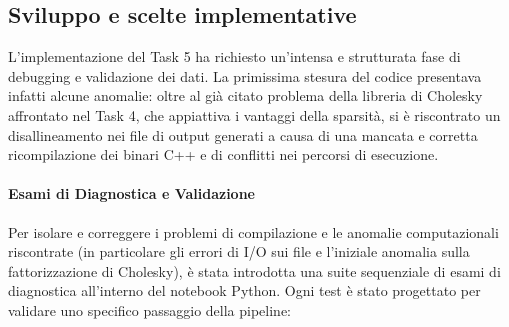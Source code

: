 \documentclass[twocolumn]{article}
\begin{document}
\subsection{Sviluppo e scelte implementative}

L'implementazione del Task 5 ha richiesto un'intensa
e strutturata fase di debugging e validazione dei dati. 
La primissima stesura del codice presentava infatti alcune anomalie:
 oltre al già citato problema della libreria di Cholesky affrontato nel Task 4,
  che appiattiva i vantaggi della sparsità, si è riscontrato un disallineamento
   nei file di output generati a causa di una mancata e corretta ricompilazione dei binari C++
    e di conflitti nei percorsi di esecuzione.

\paragraph{Esami di Diagnostica e Validazione}
Per isolare e correggere i problemi di compilazione e le anomalie computazionali riscontrate (in particolare gli errori di I/O sui file e l'iniziale anomalia sulla fattorizzazione di Cholesky), è stata introdotta una suite sequenziale di esami di diagnostica all'interno del notebook Python. 
Ogni test è stato progettato per validare uno specifico passaggio della pipeline:
\end{document}

